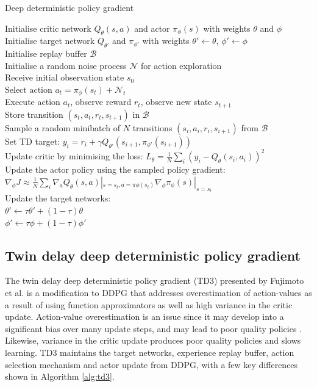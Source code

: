 \begin{algorithm}[htb!]
\caption{Deep deterministic policy gradient}\label{alg:ddpg}
Initialise critic network $Q_{\theta}(s,a)$ and actor $\pi_{\phi}(s)$ with weights $\theta$ and $\phi$ \\
Initialise target network $Q_{\theta'}$ and $\pi_{\phi'}$ with weights $\theta' \leftarrow \theta$, $\phi' \leftarrow \phi$ \\
Initialise replay buffer $\mathcal{B}$ \\
{
    Initialise a random noise process $\mathcal{N}$ for action exploration \\
    Receive initial observation state $s_0$\\
    {
        $\text{Select action } a_t = \pi_{\phi}(s_t) + \mathcal{N}_t$\\
        Execute action $a_t$, observe reward $r_t$, observe new state $s_{t+1}$ \\
        Store transition $(s_t, a_t, r_t, s_{t+1})$ in $\mathcal{B}$ \\
        Sample a random minibatch of $N$ transitions $(s_i, a_i, r_i, s_{i+1})$ from $\mathcal{B}$ \\
        Set TD target: $y_i = r_i + \gamma Q_{\theta'}(s_{i+1}, \pi_{\phi'}(s_{i+1}))$ \\
        Update critic by minimising the loss: $L_{\theta}=\frac{1}{N} \sum_i (y_i - Q_{\theta}(s_i,a_i))^2 $ \\
        Update the actor policy using the sampled policy gradient:
        $\nabla_{\phi} J \approx \frac{1}{N} \sum_i \nabla_{a} Q_{\theta}(s,a)|_{s=s_t, a=\pi{\phi}(s_t)} \nabla_{\phi} \pi_{\phi}(s)|_{s=s_t} $\\
        Update the target networks:\\
        $\theta' \leftarrow \tau \theta' + (1 - \tau) \theta$\\
        $\phi' \leftarrow \tau \phi + (1 - \tau) \phi'$\\
    }
}
\end{algorithm}


\subsection{Twin delay deep deterministic policy gradient}

The twin delay deep deterministic policy gradient (TD3) presented by Fujimoto et al. \cite{Fujimoto2018} is a modification to DDPG that addresses overestimation of action-values as a result of using function approximators as well as high variance in the critic update.
Action-value overestimation is an issue since it may develop into a significant bias over many update steps, and may lead to poor quality policies \cite{hasselt2015}.
Likewise, variance in the critic update produces poor quality policies and slows learning.
TD3 maintains the target networks, experience replay buffer, action selection mechanism and actor update from DDPG, with a few key differences shown in Algorithm \ref{alg:td3}.

